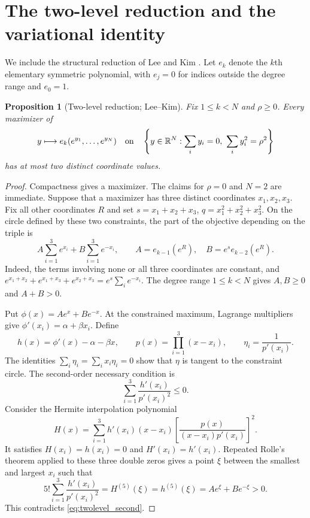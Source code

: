\documentclass[11pt,a4paper]{article}
\newtheorem{proposition}[theorem]{Proposition}
\begin{document}
\section{The two-level reduction and the variational identity}\label{sec:exchangeable}
We include the structural reduction of Lee and Kim \cite[Proposition 2 and Remark 1]{LeeKim}. Let $e_k$ denote the $k$th elementary symmetric polynomial, with $e_j=0$ for indices outside the degree range and $e_0=1$.

\begin{proposition}[Two-level reduction; Lee--Kim]\label{prop:two_level}
Fix $1\le k<N$ and $\rho\ge0$. Every maximizer of
\[
 y\longmapsto e_k(e^{y_1},\ldots,e^{y_N})
 \quad\text{on}\quad
 \left\{y\in\mathbb R^N:\sum_i y_i=0,\ \sum_i y_i^2=\rho^2\right\}
\]
has at most two distinct coordinate values.
\end{proposition}
\begin{proof}
Compactness gives a maximizer. The claims for $\rho=0$ and $N=2$ are immediate. Suppose that a maximizer has three distinct coordinates $x_1,x_2,x_3$. Fix all other coordinates $R$ and set $s=x_1+x_2+x_3$, $q=x_1^2+x_2^2+x_3^2$. On the circle defined by these two constraints, the part of the objective depending on the triple is
\[
 A\sum_{i=1}^3e^{x_i}+B\sum_{i=1}^3e^{-x_i},
 \qquad A=e_{k-1}(e^R),\quad B=e^s e_{k-2}(e^R).
\]
Indeed, the terms involving none or all three coordinates are constant, and $e^{x_1+x_2}+e^{x_1+x_3}+e^{x_2+x_3}=e^s\sum_i e^{-x_i}$. The degree range $1\le k<N$ gives $A,B\ge0$ and $A+B>0$.

Put $\phi(x)=Ae^x+Be^{-x}$. At the constrained maximum, Lagrange multipliers give $\phi'(x_i)=\alpha+\beta x_i$. Define
\[
 h(x)=\phi'(x)-\alpha-\beta x,\qquad p(x)=\prod_{i=1}^3(x-x_i),\qquad
 \eta_i=\frac1{p'(x_i)}.
\]
The identities $\sum_i\eta_i=\sum_i x_i\eta_i=0$ show that $\eta$ is tangent to the constraint circle. The second-order necessary condition is
\begin{equation}\label{eq:twolevel_second}
 \sum_{i=1}^3\frac{h'(x_i)}{p'(x_i)^2}\le0.
\end{equation}
Consider the Hermite interpolation polynomial
\[
 H(x)=\sum_{i=1}^3h'(x_i)(x-x_i)
 \left[\frac{p(x)}{(x-x_i)p'(x_i)}\right]^2.
\]
It satisfies $H(x_i)=h(x_i)=0$ and $H'(x_i)=h'(x_i)$. Repeated Rolle's theorem applied to these three double zeros gives a point $\xi$ between the smallest and largest $x_i$ such that
\[
 5!\sum_{i=1}^3\frac{h'(x_i)}{p'(x_i)^2}
 =H^{(5)}(\xi)=h^{(5)}(\xi)=Ae^\xi+Be^{-\xi}>0.
\]
This contradicts \eqref{eq:twolevel_second}.
\end{proof}
\end{document}
